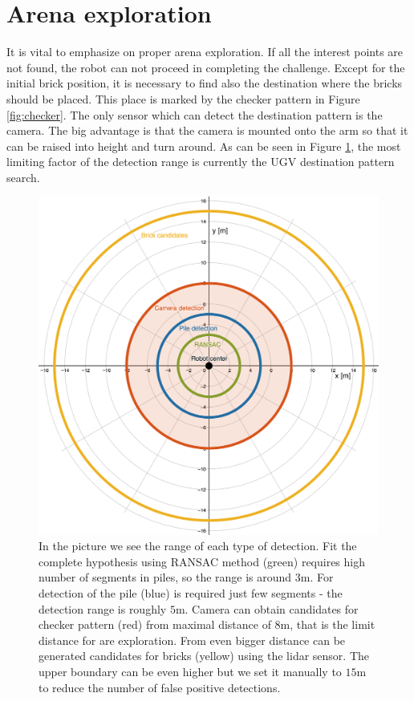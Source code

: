 \section{Arena exploration}
It is vital to emphasize on proper arena exploration. If all the interest points are not found, the robot can not proceed in completing the challenge. Except for the initial brick position, it is necessary to find also the destination where the bricks should be placed. This place is marked by the checker pattern in Figure \ref{fig:checker}. The only sensor which can detect the destination pattern is the camera. The big advantage is that the camera is mounted onto the arm so that it can be raised into height and turn around. As can be seen in Figure \ref{fig:detection_range}, the most limiting factor of the detection range is currently the UGV destination pattern search.

\begin{figure}[H]
	\centering
	\includegraphics[scale=0.38]{fig/detection_range.png}
	\caption[Detection ranges]{In the picture we see the range of each type of detection. Fit the complete hypothesis using RANSAC method (green) requires high number of segments in piles, so the range is around $3$m. For detection of the pile (blue) is required just few segments - the detection range is roughly $5$m. Camera can obtain candidates for checker pattern (red) from maximal distance of $8$m, that is the limit distance for are exploration. From even bigger distance can be generated candidates for bricks (yellow) using the lidar sensor. The upper boundary can be even higher but we set it manually to $15$m to reduce the number of false positive detections.}
	\label{fig:detection_range}
\end{figure}

